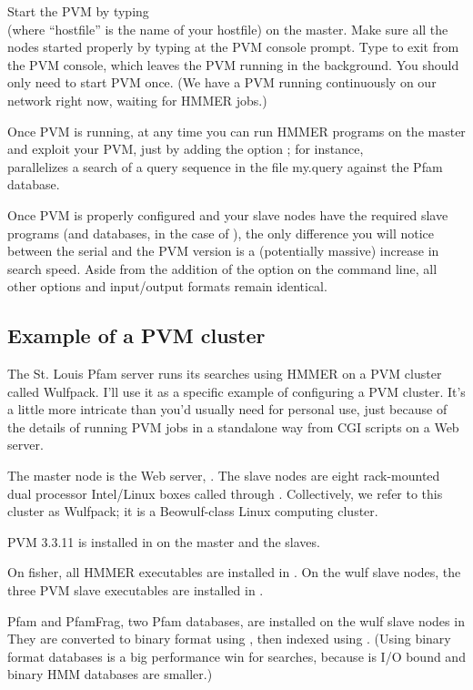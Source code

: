 Start the PVM by typing\\
(where ``hostfile'' is the
name of your hostfile) on the master. Make sure all the nodes started
properly by typing 
at the PVM console prompt.
Type 
 to exit from the PVM console,
which leaves the PVM running in the background.
You should only need to start PVM once. (We have a
PVM running continuously on our network right now, waiting
for HMMER jobs.)

Once PVM is running, at any time you can run HMMER programs on the
master and exploit your PVM, just by adding the option ;
for instance,\\
parallelizes a search of
a query sequence in the file my.query against the Pfam database.

Once PVM is properly configured and your slave nodes have the required
slave programs (and databases, in the case of ), the
only difference you will notice between the serial and the PVM version
is a (potentially massive) increase in search speed. Aside from the
addition of the  option on the command line, all other
options and input/output formats remain identical.

\subsection{Example of a PVM cluster}

The St. Louis Pfam server runs its searches using HMMER on a PVM
cluster called Wulfpack. I'll use it as a specific example of
configuring a PVM cluster. It's a little more intricate than you'd
usually need for personal use, just because of the details of running
PVM jobs in a standalone way from CGI scripts on a Web server.

The master node is the Web server, . The slave nodes are
eight rack-mounted dual processor Intel/Linux boxes called
 through . Collectively, we refer to
this cluster as Wulfpack; it is a Beowulf-class Linux computing
cluster.

PVM 3.3.11 is installed in  on the master and the
slaves. 

On fisher, all HMMER executables are installed in
.  On the wulf slave nodes, the three PVM slave
executables are installed in
.

Pfam and PfamFrag, two Pfam databases, are installed on the wulf slave
nodes in  They are converted to binary
format using , then indexed using .
(Using binary format databases is a big performance win for
 searches, because  is I/O bound and  
binary HMM databases are smaller.)

